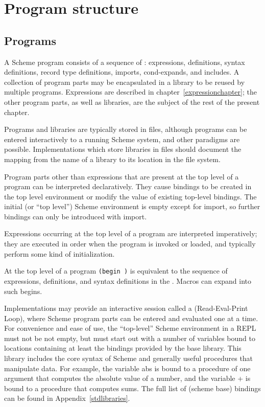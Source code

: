 \chapter{Program structure}
\label{programchapter}

\section{Programs}

A Scheme program consists of a sequence of 
: expressions, definitions, syntax definitions,
record type definitions, imports, cond-expands, and includes.  A collection of program
parts may be encapsulated in a library to be reused by multiple
programs.
Expressions are described in chapter~\ref{expressionchapter};
the other program parts, as well as libraries, are the subject of the
rest of the present chapter.

Programs and libraries are typically stored in files, although programs
can be entered interactively to a running Scheme system, and other
paradigms are possible.
Implementations which store libraries in files should document the
mapping from the name of a library to its location in the file system.

Program parts other than expressions that are present
at the top level of a program can be interpreted declaratively.
They cause bindings to be created in the top level
environment or modify the value of existing top-level bindings.
The initial (or
``top level'') Scheme environment is empty except for {\cf import},
so further bindings can only be introduced with {\cf import}.

Expressions occurring at the top level of a program are
interpreted imperatively; they are executed in order when the program is
invoked or loaded, and typically perform some kind of initialization.

At the top level of a program {\tt(begin  \dotsfoo)} is
equivalent to the sequence of expressions, definitions, and syntax definitions
in the .   Macros can expand into such {\cf begin}s.

Implementations may provide an interactive session called a
 (Read-Eval-Print Loop), where Scheme program parts can be
entered and evaluated one at a time.  For convenience and ease of use,
the ``top-level'' Scheme environment in a REPL
must not be not empty, but must start out with a number of variables
bound to locations containing at least the bindings provided by the
base library.  This library includes the core syntax of Scheme
and generally useful procedures that manipulate data.  For example, the
variable {\cf abs} is bound to a
procedure of one argument that computes the absolute value of a
number, and the variable {\cf +} is bound to a procedure that computes
sums.  The full list of {\cf(scheme base)} bindings can be found in
Appendix~\ref{stdlibraries}.


